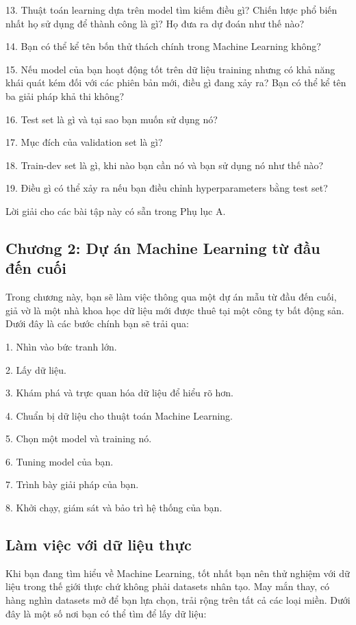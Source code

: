 13. Thuật toán learning dựa trên model tìm kiếm điều gì? Chiến lược phổ biến nhất họ sử dụng để thành công là gì? Họ đưa ra dự đoán như thế nào?

14. Bạn có thể kể tên bốn thử thách chính trong Machine Learning không?

15. Nếu model của bạn hoạt động tốt trên dữ liệu training nhưng có khả năng khái quát kém đối với các phiên bản mới, điều gì đang xảy ra? Bạn có thể kể tên ba giải pháp khả thi không?

16. Test set là gì và tại sao bạn muốn sử dụng nó?

17. Mục đích của validation set là gì?

18. Train-dev set là gì, khi nào bạn cần nó và bạn sử dụng nó như thế nào?

19. Điều gì có thể xảy ra nếu bạn điều chỉnh hyperparameters bằng test set?

Lời giải cho các bài tập này có sẵn trong Phụ lục A.

\subsection{Chương 2: Dự án Machine Learning từ đầu đến cuối}

Trong chương này, bạn sẽ làm việc thông qua một dự án mẫu từ đầu đến cuối, giả vờ là một nhà khoa học dữ liệu mới được thuê tại một công ty bất động sản. Dưới đây là các bước chính bạn sẽ trải qua:

1. Nhìn vào bức tranh lớn.

2. Lấy dữ liệu.

3. Khám phá và trực quan hóa dữ liệu để hiểu rõ hơn.

4. Chuẩn bị dữ liệu cho thuật toán Machine Learning.

5. Chọn một model và training nó.

6. Tuning model của bạn.

7. Trình bày giải pháp của bạn.

8. Khởi chạy, giám sát và bảo trì hệ thống của bạn.

\subsection{Làm việc với dữ liệu thực}

Khi bạn đang tìm hiểu về Machine Learning, tốt nhất bạn nên thử nghiệm với dữ liệu trong thế giới thực chứ không phải datasets nhân tạo. May mắn thay, có hàng nghìn datasets mở để bạn lựa chọn, trải rộng trên tất cả các loại miền. Dưới đây là một số nơi bạn có thể tìm để lấy dữ liệu:

